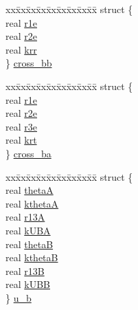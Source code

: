 \begin{DoxyCompactItemize}
\begin{tabbing}
\end{tabbing}\item 
\begin{tabbing}
xx\=xx\=xx\=xx\=xx\=xx\=xx\=xx\=xx\=\kill
struct \{\\
\>real \hyperlink{uniont__iparams_ae02b26d0e0ab550fe4cfce03394745f1}{r1e}\\
\>real \hyperlink{uniont__iparams_a70a44f4e45a7d84efd330354ba816780}{r2e}\\
\>real \hyperlink{uniont__iparams_aca0199cb2cae110d3100d77d4dbbb575}{krr}\\
\} \hyperlink{uniont__iparams_aa8f81192e53cb4a365c8f4af6229b27e}{cross\_bb}\\

\end{tabbing}\item 
\begin{tabbing}
xx\=xx\=xx\=xx\=xx\=xx\=xx\=xx\=xx\=\kill
struct \{\\
\>real \hyperlink{uniont__iparams_ae02b26d0e0ab550fe4cfce03394745f1}{r1e}\\
\>real \hyperlink{uniont__iparams_a70a44f4e45a7d84efd330354ba816780}{r2e}\\
\>real \hyperlink{uniont__iparams_ad7f21f15de2058adad587fa20a745762}{r3e}\\
\>real \hyperlink{uniont__iparams_ada7f931977aa8013c7f5220c9c57074d}{krt}\\
\} \hyperlink{uniont__iparams_a54c3d3c2ef9137bdbc0d536e445afbf0}{cross\_ba}\\

\end{tabbing}\item 
\begin{tabbing}
xx\=xx\=xx\=xx\=xx\=xx\=xx\=xx\=xx\=\kill
struct \{\\
\>real \hyperlink{uniont__iparams_ab8bb8747fb121e0cb9d745f65da9ea5e}{thetaA}\\
\>real \hyperlink{uniont__iparams_a6e798cc22000d961f109d5bb800141a7}{kthetaA}\\
\>real \hyperlink{uniont__iparams_af3be3c381f7a93d998b65f63e6b1490c}{r13A}\\
\>real \hyperlink{uniont__iparams_ada121915ef9c65998d87f4f3fedf63f0}{kUBA}\\
\>real \hyperlink{uniont__iparams_a829cbdd7ca469bd94e404aec2e99b73b}{thetaB}\\
\>real \hyperlink{uniont__iparams_abb5f2c9324ba3feda84b0934df1230c7}{kthetaB}\\
\>real \hyperlink{uniont__iparams_aee9a9e5ef09acc62054a8053f981b8a1}{r13B}\\
\>real \hyperlink{uniont__iparams_a05c8854b2e571d50abe4bd9862b9f985}{kUBB}\\
\} \hyperlink{uniont__iparams_a77afba05280648352a020b262237e700}{u\_b}\\


\end{tabbing}
\end{DoxyCompactItemize}

